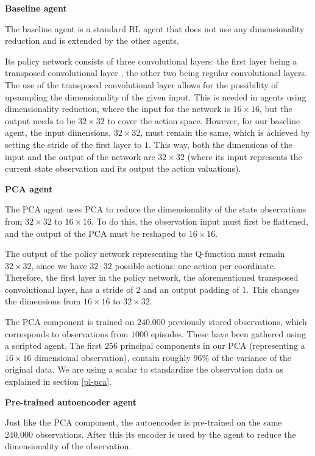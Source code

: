 \noindent \textbf{Baseline agent}\par
\noindent The baseline agent is a standard RL agent that does not use any dimensionality reduction and is extended by the other agents.

Its policy network consists of three convolutional layers: the first layer being a transposed convolutional layer \cite{transpose}, the other two being regular convolutional layers. The use of the transposed convolutional layer allows for the possibility of upsampling the dimensionality of the given input. This is needed in agents using dimensionality reduction, where the input for the network is $16 \times 16$, but the output needs to be $32 \times 32$ to cover the action space. However, for our baseline agent, the input dimensions, $32 \times 32$, must remain the same, which is achieved by setting the stride of the first layer to $1$. This way, both the dimensions of the input and the output of the network are $32 \times 32$ (where its input represents the current state observation and its output the action valuations).\newline\par

\noindent \textbf{PCA agent}\par
\noindent The PCA agent uses PCA to reduce the dimensionality of the state observations from $32 \times 32$ to $16 \times 16$. To do this, the observation input must first be flattened, and the output of the PCA must be reshaped to $16 \times 16$.

The output of the policy network representing the Q-function must remain $32 \times 32$, since we have $32 \cdot 32$ possible actions: one action per coordinate. Therefore, the first layer in the policy network, the aforementioned transposed convolutional layer, has a stride of $2$ and an output padding of $1$. This changes the dimensions from $16 \times 16$ to $32 \times 32$. 

The PCA component is trained on $240.000$ previously stored observations, which corresponds to observations from $1000$ episodes. These have been gathered using a scripted agent. The first $256$ principal components in our PCA (representing a $16 \times 16$ dimensional observation), contain roughly $96\%$ of the variance of the original data. We are using a scalar to standardize the observation data as explained in section \ref{pl-pca}. \newline\par

\noindent \textbf{Pre-trained autoencoder agent}\par
\noindent Just like the PCA component, the autoencoder is pre-trained on the same $240.000$ observations. After this its encoder is used by the agent to reduce the dimensionality of the observation. 


